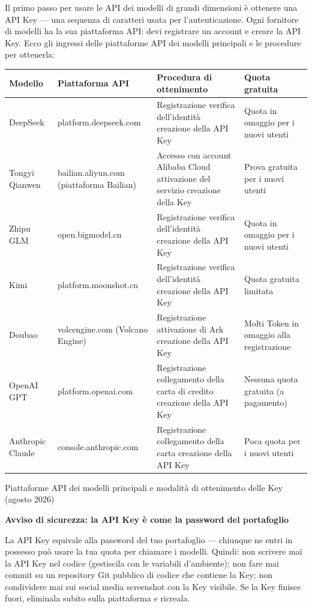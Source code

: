 
Il primo passo per usare le API dei modelli di grandi dimensioni è ottenere una API Key — una sequenza di caratteri usata per l'autenticazione. Ogni fornitore di modelli ha la sua piattaforma API: devi registrare un account e creare la API Key. Ecco gli ingressi delle piattaforme API dei modelli principali e le procedure per ottenerla:

\begin{center}
\begin{tabularx}{\linewidth}{|X|X|X|X|}
\hline
\textbf{Modello} & \textbf{Piattaforma API} & \textbf{Procedura di ottenimento} & \textbf{Quota gratuita} \tabularnewline
\hline
DeepSeek & platform.deepseek.com & Registrazione verifica dell'identità creazione della API Key & Quota in omaggio per i nuovi utenti \tabularnewline
Tongyi Qianwen & bailian.aliyun.com (piattaforma Bailian) & Accesso con account Alibaba Cloud attivazione del servizio creazione della Key & Prova gratuita per i nuovi utenti \tabularnewline
Zhipu GLM & open.bigmodel.cn & Registrazione verifica dell'identità creazione della API Key & Quota in omaggio per i nuovi utenti \tabularnewline
Kimi & platform.moonshot.cn & Registrazione verifica dell'identità creazione della API Key & Quota gratuita limitata \tabularnewline
Doubao & volcengine.com (Volcano Engine) & Registrazione attivazione di Ark creazione della API Key & Molti Token in omaggio alla registrazione \tabularnewline
OpenAI GPT & platform.openai.com & Registrazione collegamento della carta di credito creazione della API Key & Nessuna quota gratuita (a pagamento) \tabularnewline
Anthropic Claude & console.anthropic.com & Registrazione collegamento della carta creazione della API Key & Poca quota per i nuovi utenti \tabularnewline
\hline
\end{tabularx}
\end{center}

\begin{center}\small\color{gray}Piattaforme API dei modelli principali e modalità di ottenimento delle Key (agosto 2026)\end{center}

\textbf{Avviso di sicurezza: la API Key è come la password del portafoglio}\par

La API Key equivale alla password del tuo portafoglio — chiunque ne entri in possesso può usare la tua quota per chiamare i modelli. Quindi: non scrivere mai la API Key nel codice (gestiscila con le variabili d'ambiente); non fare mai commit su un repository Git pubblico di codice che contiene la Key; non condividere mai sui social media screenshot con la Key visibile. Se la Key finisce fuori, eliminala subito sulla piattaforma e ricreala.

